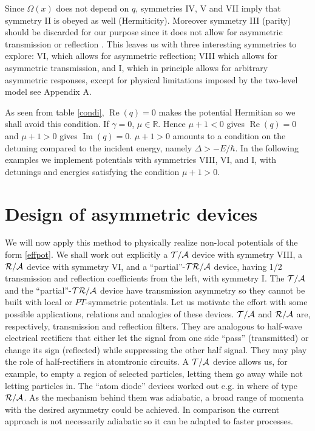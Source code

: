 Since $\Omega(x)$ does not depend on $q$, symmetries IV, V and VII imply that symmetry II is obeyed as well (Hermiticity).
Moreover symmetry III (parity) should be discarded for our purpose since it does not allow for asymmetric transmission or reflection
\cite{Ruschhaupt2017}.
This leaves us with three interesting symmetries to explore:
VI, which allows for  asymmetric reflection; VIII which allows for asymmetric transmission, and  I,
which in principle allows for arbitrary asymmetric responses, except for physical limitations imposed by
the two-level model see Appendix A.


%
%
As seen from  table \ref{condi}, $\operatorname{Re}(q)=0$ makes the potential Hermitian so we shall avoid this condition.
If $\gamma=0$,   $\mu \in \mathbb{R}$. Hence $\mu+1<0$ gives $\operatorname{Re}(q)=0$ and $\mu+1>0$ gives
$\operatorname{Im}(q)=0$. $\mu+1>0$ amounts to a condition on the detuning compared to the incident energy, namely $\Delta>-E/\hbar$.
In the following examples we implement potentials with symmetries VIII, VI, and I, with detunings and energies satisfying the condition $\mu+1>0$.
%
%
%

%
%
%
\section{Design of asymmetric devices\label{exa}}
%
%
We will now apply this method to physically realize non-local potentials of the form \eqref{effpot}.
%
We  shall work out  explicitly a ${\cal T/A}$ device with symmetry  VIII, a ${\cal R/A}$ device with symmetry  VI, and a ``partial''-${\cal TR/A}$ device,  having 1/2 transmission and reflection coefficients from the left, with symmetry I. The  ${\cal T/A}$ and the ``partial''-${\cal TR/A}$ device have transmission asymmetry so they cannot be built with local or $PT$-symmetric  potentials.
Let us  motivate the effort with some possible applications, relations  and analogies of these devices.
${\cal T/A}$ and ${\cal R/A}$ are, respectively, transmission and reflection filters. They are analogous to
half-wave electrical rectifiers that either let the signal from one side ``pass'' (transmitted) or change its sign (reflected)
while suppressing the other half signal.  They may play the role of half-rectifiers in atomtronic circuits.
A ${\cal T/A}$ device allows us, for example, to empty a region of selected particles, letting them go away while not letting particles in.
The ``atom diode'' devices worked out e.g. in \cite{Ruschhaupt2004,Ruschhaupt2006a,Ruschhaupt2006,Ruschhaupt2007}
where of type ${\cal R/A}$. As the mechanism behind them was adiabatic, a broad range of momenta with the desired asymmetry
could be achieved. In comparison the current approach is not necessarily adiabatic so it can be adapted to faster processes.

